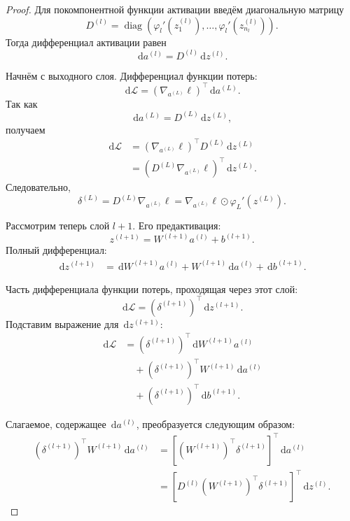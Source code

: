 \documentclass[12pt,a4paper]{article}
\theoremstyle{plain}
\theoremstyle{definition}
\theoremstyle{remark}
\newcommand{\dd}{\,\mathrm{d}}
\newcommand{\diag}{\operatorname{diag}}
\begin{document}
\begin{proof}
Для покомпонентной функции активации введём диагональную матрицу
\[
    D^{(l)}
    =
    \diag\left(
        \varphi_l'(z_1^{(l)}),
        \ldots,
        \varphi_l'(z_{n_l}^{(l)})
    \right).
\]
Тогда дифференциал активации равен
\[
    \dd a^{(l)}
    =
    D^{(l)}\dd z^{(l)}.
\]

Начнём с выходного слоя. Дифференциал функции потерь:
\[
    \dd\mathcal{L}
    =
    \left(
        \nabla_{a^{(L)}}\ell
    \right)^\top
    \dd a^{(L)}.
\]
Так как
\[
    \dd a^{(L)}
    =
    D^{(L)}\dd z^{(L)},
\]
получаем
\[
\begin{aligned}
    \dd\mathcal{L}
    &=
    \left(
        \nabla_{a^{(L)}}\ell
    \right)^\top
    D^{(L)}
    \dd z^{(L)}\\
    &=
    \left(
        D^{(L)}
        \nabla_{a^{(L)}}\ell
    \right)^\top
    \dd z^{(L)}.
\end{aligned}
\]
Следовательно,
\[
    \delta^{(L)}
    =
    D^{(L)}
    \nabla_{a^{(L)}}\ell
    =
    \nabla_{a^{(L)}}\ell
    \odot
    \varphi_L'(z^{(L)}).
\]

Рассмотрим теперь слой $l+1$. Его предактивация:
\[
    z^{(l+1)}
    =
    W^{(l+1)}a^{(l)}+b^{(l+1)}.
\]
Полный дифференциал:
\[
\begin{aligned}
    \dd z^{(l+1)}
    &=
    \dd W^{(l+1)}a^{(l)}
    +
    W^{(l+1)}\dd a^{(l)}
    +
    \dd b^{(l+1)}.
\end{aligned}
\]

Часть дифференциала функции потерь, проходящая через этот слой:
\[
    \dd\mathcal{L}
    =
    \left(
        \delta^{(l+1)}
    \right)^\top
    \dd z^{(l+1)}.
\]
Подставим выражение для $\dd z^{(l+1)}$:
\[
\begin{aligned}
    \dd\mathcal{L}
    &=
    \left(
        \delta^{(l+1)}
    \right)^\top
    \dd W^{(l+1)}a^{(l)}\\
    &\quad+
    \left(
        \delta^{(l+1)}
    \right)^\top
    W^{(l+1)}\dd a^{(l)}\\
    &\quad+
    \left(
        \delta^{(l+1)}
    \right)^\top
    \dd b^{(l+1)}.
\end{aligned}
\]

Слагаемое, содержащее $\dd a^{(l)}$, преобразуется следующим
образом:
\[
\begin{aligned}
    \left(
        \delta^{(l+1)}
    \right)^\top
    W^{(l+1)}\dd a^{(l)}
    &=
    \left[
        \left(
            W^{(l+1)}
        \right)^\top
        \delta^{(l+1)}
    \right]^\top
    \dd a^{(l)}\\
    &=
    \left[
        D^{(l)}
        \left(
            W^{(l+1)}
        \right)^\top
        \delta^{(l+1)}
    \right]^\top
    \dd z^{(l)}.
\end{aligned}
\]


\end{proof}
\end{document}
